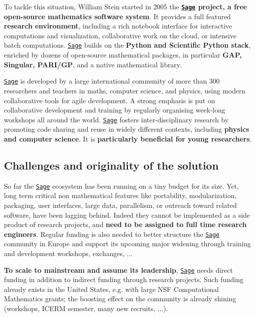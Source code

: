 \documentclass[a4,12pt]{amsart}
\newcommand{\sage}{\href{http://www.sagemath.org/}{\texttt{Sage}}\xspace}
\begin{document}
To tackle this situation, William Stein started in 2005 the
\textbf{\sage{} project, a free open-source mathematics software
  system}. It provides a full featured \textbf{research environment},
including a rich notebook interface for interactive computations and
visualization, collaborative work on the cloud, or intensive batch
computations. \sage{} builds on the \textbf{Python and Scientific
  Python stack}, enriched by dozens of open-source mathematical
packages, in particular \textbf{GAP, Singular, PARI/GP}, and a native
mathematical library.

\sage{} is developed by a large international community of more than 300
researchers and teachers in maths, computer science, and physics,
using modern collaborative tools for agile development.  A strong
emphasis is put on collaborative development and training by regularly
organising week-long workshops all around the world. \sage{} fosters
inter-disciplinary research by promoting code sharing and reuse in
widely different contexts, including \textbf{physics and computer
  science}. It is \textbf{particularly beneficial for young
  researchers}.


\subsection{Challenges and originality of the solution}

So far the \sage{} ecosystem has been running on a tiny budget for its
size. Yet, long term critical non mathematical features like
portability, modularization, packaging, user interfaces, large data,
parallelism, or outreach toward related software, have been lagging
behind. Indeed they cannot be implemented as a side product of
research projects, and \textbf{need to be assigned to full time
  research engineers}. Regular funding is also needed to better
structure the \sage{} community in Europe and support its upcoming
major widening through training and development workshops, exchanges,
...
%
%

\textbf{To scale to mainstream and assume its leadership}, \sage{} needs
direct funding in addition to indirect funding through research
projects. Such funding already exists in the United States, e.g. with
large %
NSF Computational Mathematics grants; the boosting effect on the
community is already shining (workshops, ICERM semester, many new
recruits, ...).
\end{document}
